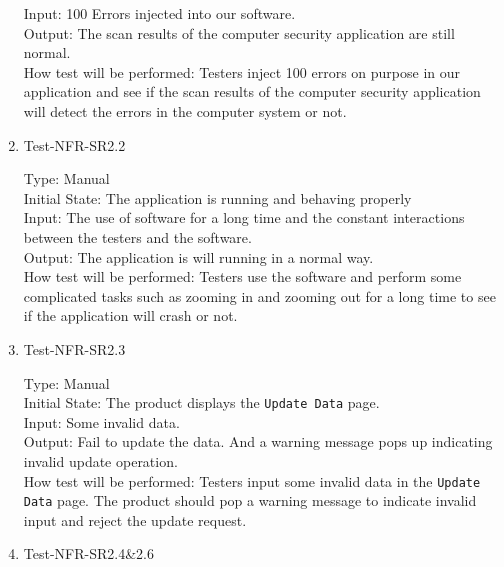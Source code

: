 \documentclass[12pt, titlepage]{article}
\begin{document}
\begin{enumerate}
Input: 100 Errors injected into our software.\\

Output: The scan results of the computer security application are still normal.\\

How test will be performed: Testers inject 100 errors on purpose in our application and see if the scan results of the computer security application will detect the errors in the computer system or not.

\item{Test-NFR-SR2.2\\}

Type: Manual\\

Initial State: The application is running and behaving properly\\

Input: The use of software for a long time and the constant interactions between the testers and the software.\\

Output: The application is will running in a normal way.\\

How test will be performed: Testers use the software and perform some complicated tasks such as zooming in and zooming out for a long time to see if the application will crash or not.

\item{Test-NFR-SR2.3\\}

Type: Manual\\

Initial State: The product displays the \verb|Update Data| page.\\

Input: Some invalid data.\\

Output: Fail to update the data. And a warning message pops up indicating invalid update operation.\\

How test will be performed: Testers input some invalid data in the \verb|Update Data| page. The product should pop a warning message to indicate invalid input and reject the update request.\\



\item{Test-NFR-SR2.4\&2.6\\}


\end{enumerate}
\end{document}
